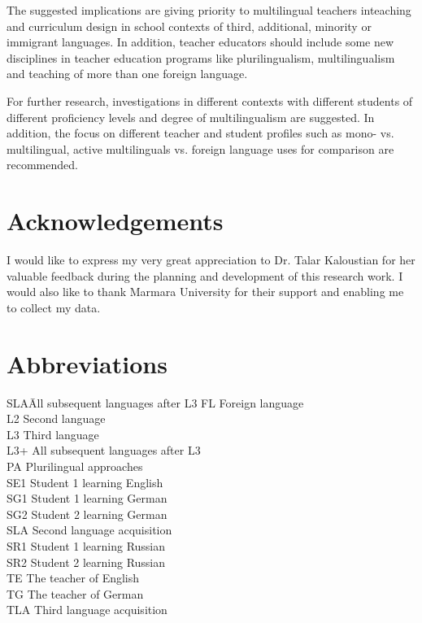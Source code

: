 \documentclass[output=paper]{../langscibook}
\begin{document}
The suggested implications are giving priority to multilingual teachers in\linebreak teaching and curriculum design in school contexts of third, additional, minority or immigrant languages. In addition, teacher educators should include some new disciplines in teacher education programs like plurilingualism, multilingualism and teaching of more than one foreign language.

For further research, investigations in different contexts with different students of different proficiency levels and degree of multilingualism are suggested. In addition, the focus on different teacher and student profiles such as mono- vs. multilingual, active multilinguals vs. foreign language uses for comparison are recommended.

\section*{Acknowledgements}

I would like to express my very great appreciation to Dr. Talar Kaloustian for her valuable feedback during the planning and development of this research work. I would also like to thank Marmara University for their support and enabling me to collect my data.

\section*{Abbreviations}
\begin{multicols}{2}
\begin{tabbing}
SLA\quad \=  All subsequent languages after L3\kill
FL  \>  Foreign language\\
L2  \>  Second language\\
L3  \>  Third language\\
L3+ \>  All subsequent languages after L3\\
PA  \>  Plurilingual approaches\\
SE1 \>  Student 1 learning English\\
SG1 \>  Student 1 learning German\\
SG2 \>  Student 2 learning German\\
SLA \>  Second language acquisition\\
SR1 \>  Student 1 learning Russian\\
SR2 \>  Student 2 learning Russian\\
TE  \>  The teacher of English\\
TG  \>  The teacher of German\\
TLA \>  Third language acquisition
\end{tabbing}
\end{multicols}
\end{document}
